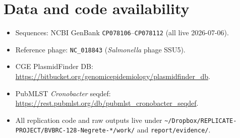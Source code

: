 \documentclass[11pt]{article}
\begin{document}
\section{Data and code availability}
\begin{itemize}
\item Sequences: NCBI GenBank \texttt{CP078106}--\texttt{CP078112} (all live 2026-07-06).
\item Reference phage: \texttt{NC\_018843} (\emph{Salmonella} phage SSU5).
\item CGE PlasmidFinder DB: \url{https://bitbucket.org/genomicepidemiology/plasmidfinder_db}.
\item PubMLST \emph{Cronobacter} seqdef: \url{https://rest.pubmlst.org/db/pubmlst_cronobacter_seqdef}.
\item All replication code and raw outputs live under
      \texttt{\textasciitilde/Dropbox/REPLICATE-PROJECT/BVBRC-128-Negrete-*/work/} and
      \texttt{report/evidence/}.
\end{itemize}
\end{document}
